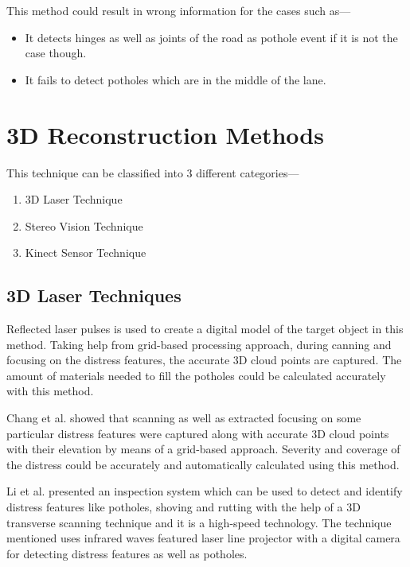     \vspace{8mm}
    This method could result in wrong information for the cases such as---
    \begin{itemize}
        \item {It detects hinges as well as joints of the road\cite{kim14} as pothole event if it is not the case though.}
        \item{It fails to detect potholes which are in the middle of the lane.}
    \end{itemize}
    
\section{3D Reconstruction Methods}
    This technique can be classified into 3 different categories---
    \begin{enumerate}
        \item{3D Laser Technique}
        \item{Stereo Vision Technique}
        \item{Kinect Sensor Technique}
    \end{enumerate}
    
    \subsection{3D Laser Techniques}
        Reflected laser pulses is used to create a digital model of the target object in this method\cite{akagic17,danti12}. Taking help from grid-based processing approach\cite{kim14}, during canning and focusing on the distress features, the accurate 3D cloud points are captured. The amount of materials needed to fill the potholes could be calculated accurately with this method.
        
        \vspace{8mm}
        Chang et al. showed that scanning as well as extracted focusing on some particular distress features were captured along with accurate 3D cloud points with their elevation by means of a grid-based approach\cite{chang05}. Severity and coverage of the distress could be accurately and automatically calculated using this method\cite{chang05,kim14}.
        
        \vspace{8mm}
        Li et al. presented an inspection system\cite{li09} which can be used to detect and identify distress features like potholes, shoving and rutting with the help of a 3D transverse scanning technique\cite{li09} and it is a high-speed technology. The technique mentioned uses infrared waves featured laser line projector with a digital camera for detecting distress features as well as potholes\cite{li09}. 
        
